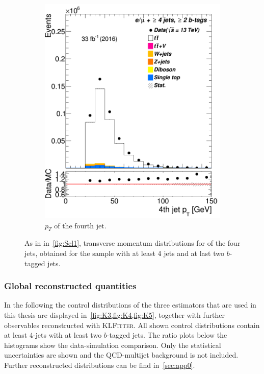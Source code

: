 \begin{figure} [t]
\begin{subfigure}{0.25\textwidth}
		\includegraphics[width=\linewidth]{ControlPlots_emujets_2016_4incl_2incl/jet3_pt_emujets_2016.png}
		\caption{$p_T$ of the fourth jet.} \label{fig:Sec28}
	\end{subfigure}
	
	
	\caption{As in in~\cref{fig:Sel1}, transverse momentum distributions  for of the four jets, obtained for the sample with at least 4 jets and at last two $b$-tagged jets.}
	\label{fig:Sel4}
\end{figure}



\subsubsection{Global reconstructed quantities}


In the following the control distributions of the three estimators that are used in this thesis are displayed in~\cref{fig:K3,fig:K4,fig:K5}, together with further observables  reconstructed with \textsc{KLFitter}. 
All shown control distributions contain at least $4$-jets with at least two $b$-tagged jets.  The ratio plots below the histograms show the data-simulation comparison. Only the statistical uncertainties are shown and the QCD-multijet background is not included. Further reconstructed distributions can be find in~\cref{sec:app0}. 



